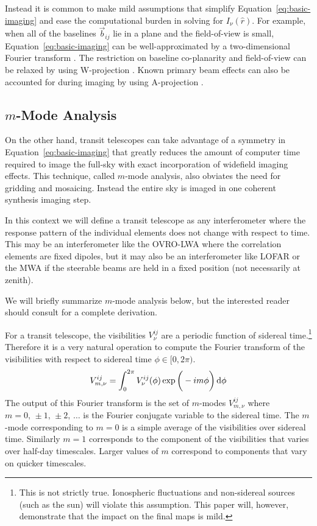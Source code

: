 \documentclass[twocolumn]{aastex61}
\renewcommand{\d}{{\rm d}}
\begin{document}
Instead it is common to make mild assumptions that simplify Equation~\ref{eq:basic-imaging} and ease
the computational burden in solving for $I_\nu(\hat r)$. For example, when all of the baselines
$\vec b_{ij}$ lie in a plane and the field-of-view is small, Equation~\ref{eq:basic-imaging} can be
well-approximated by a two-dimensional Fourier transform \citep{2001isra.book.....T}. The
restriction on baseline co-planarity and field-of-view can be relaxed by using W-projection
\citep{2008ISTSP...2..647C}. Known primary beam effects can also be accounted for during imaging by
using A-projection \citep{2013ApJ...770...91B}.

\subsection{$m$-Mode Analysis}

On the other hand, transit telescopes can take advantage of a symmetry in
Equation~\ref{eq:basic-imaging} that greatly reduces the amount of computer time required to image
the full-sky with exact incorporation of widefield imaging effects. This technique, called $m$-mode
analysis, also obviates the need for gridding and mosaicing. Instead the entire sky is imaged in one
coherent synthesis imaging step.

In this context we will define a transit telescope as any interferometer where the response pattern
of the individual elements does not change with respect to time. This may be an interferometer like
the OVRO-LWA where the correlation elements are fixed dipoles, but it may also be an interferometer
like LOFAR or the MWA if the steerable beams are held in a fixed position (not necessarily at
zenith).

We will briefly summarize $m$-mode analysis below, but the interested reader should consult
\citet{2014ApJ...781...57S, 2015PhRvD..91h3514S} for a complete derivation.

For a transit telescope, the visibilities $V^{ij}_\nu$ are a periodic function of sidereal
time.\footnote{
    This is not strictly true. Ionospheric fluctuations and non-sidereal sources (such as the sun)
    will violate this assumption. This paper will, however, demonstrate that the impact on the final
    maps is mild.
}
Therefore it is a very natural operation to compute the Fourier transform of the visibilities with
respect to sidereal time $\phi\in[0,2\pi)$.
\begin{equation}
    V^{ij}_{m,\nu} = \int_0^{2\pi} V^{ij}_\nu(\phi)\exp\bigg(-im\phi\bigg)\,\d\phi
\end{equation}
The output of this Fourier transform is the set of $m$-modes $V^{ij}_{m,\nu}$ where
$m=0,\,\pm1,\,\pm2,\,\ldots$ is the Fourier conjugate variable to the sidereal time. The $m$-mode
corresponding to $m=0$ is a simple average of the visibilities over sidereal time. Similarly $m=1$
corresponds to the component of the visibilities that varies over half-day timescales. Larger values
of $m$ correspond to components that vary on quicker timescales.
\end{document}
